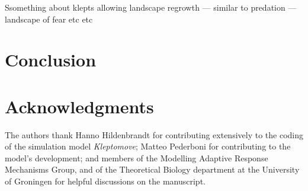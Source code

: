 \documentclass[11pt]{article}
\begin{document}


Ssomething about klepts allowing landscape regrowth --- similar to predation --- landscape of fear etc etc


\section{Conclusion}



\section{Acknowledgments}

The authors thank Hanno Hildenbrandt for contributing extensively to the coding of the simulation model \textit{Kleptomove};
Matteo Pederboni for contributing to the model's development; 
and members of the Modelling Adaptive Response Mechanisms Group, and of the Theoretical Biology department at the University of Groningen for helpful discussions on the manuscript.
\end{document}
